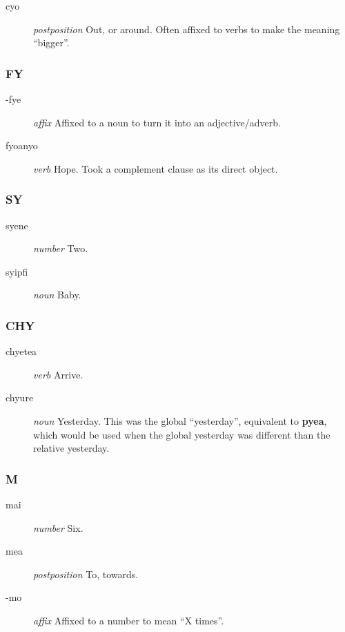 \documentclass{article}
\begin{document}
\begin{description}
\item [cyo] \emph{postposition} Out, or around.  Often affixed to verbs to make the meaning ``bigger''.
\end{description}

\subsubsection{FY}

\begin{description}
\item [-fye] \emph{affix} Affixed to a noun to turn it into an adjective/adverb.
\item [fyoanyo] \emph{verb} Hope.  Took a complement clause as its direct object.
\end{description}

\subsubsection{SY}

\begin{description}
\item [syene] \emph{number} Two.
\item [syipfi] \emph{noun} Baby.
\end{description}

\subsubsection{CHY}

\begin{description}
\item [chyetea] \emph{verb} Arrive.
\item [chyure] \emph{noun} Yesterday.  This was the global ``yesterday'', equivalent to \textbf{pyea}, which would be used when the global yesterday was different than the relative yesterday.
\end{description}

\subsubsection{M}

\begin{description}
\item [mai] \emph{number} Six.
\item [mea] \emph{postposition} To, towards.
\item [-mo] \emph{affix} Affixed to a number to mean ``X times''.
\end{description}
\end{document}
